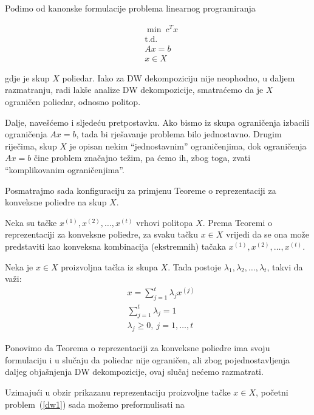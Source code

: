 \documentclass[a4paper, utf8, 11pt, colorlinks]{book}
\theoremstyle{definition}
\begin{document}
 Pođimo od kanonske formulacije problema linearnog programiranja
 
  \begin{equation}
 	\begin{aligned}\label{dw1}
 		&\min\ c^Tx\\
 		&\mbox{t.d.}\\
 	 &Ax=b\\
 		&x \in X
 	\end{aligned}
 \end{equation}
 
 gdje je skup $X$ poliedar. Iako za DW dekompoziciju nije neophodno, u daljem razmatranju, radi lakše analize DW dekompozicije, smatraćemo da je $X$ ograničen poliedar, odnosno politop.
 
 Dalje, navešćemo i sljedeću pretpostavku. Ako bismo iz skupa ograničenja izbacili ograničenja $Ax=b$, tada bi rješavanje problema bilo jednostavno. Drugim riječima, skup $X$ je opisan nekim ``jednostavnim'' ograničenjima, dok ograničenja $Ax=b$ čine problem značajno težim, pa ćemo ih, zbog toga, zvati ``komplikovanim ograničenjima''. 
 
 Posmatrajmo sada konfiguraciju za primjenu Teoreme o reprezentaciji za konveksne poliedre na skup $X$.
 
 Neka su tačke $x^{(1)},x^{(2)},\dots,x^{(t)}$ vrhovi politopa $X$.  
 Prema Teoremi o reprezentaciji za konveksne poliedre, za svaku tačku $x\in X$ vrijedi da se ona može predstaviti kao konveksna kombinacija (ekstremnih) tačaka $x^{(1)},x^{(2)},\dots,x^{(t)}$.
 
 Neka je  $x \in X$ proizvoljna tačka iz skupa $X$.  Tada postoje $\lambda_1,\lambda_2,\ldots,\lambda_t$, takvi da važi:
 \begin{equation}
 	\begin{aligned}
 		&x = \sum_{j=1}^t\lambda_jx^{(j)}\\
 		 &\sum_{j=1}^t\lambda_j = 1\\
 		&\lambda_j\geqslant 0,\ j = 1,\ldots,t
 	\end{aligned}
 \end{equation}
 
 Ponovimo da Teorema o reprezentaciji za konveksne poliedre ima svoju formulaciju i u slučaju da poliedar nije ograničen, ali zbog pojednostavljenja daljeg objašnjenja DW dekompozicije, ovaj slučaj nećemo razmatrati.
 
 Uzimajući u obzir prikazanu reprezentaciju proizvoljne tačke $x\in X$, početni problem~(\ref{dw1}) sada možemo preformulisati na
 
\end{document}

